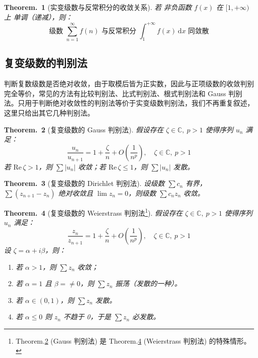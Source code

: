 \documentclass[UTF8]{report}
\def\Re{\mathrm{Re\,}}
\def\C{\mathbb{C}}
\theoremstyle{MyLineTheoremStyle} %
\newtheorem{LineTheorem}{Theorem.\,}
\theoremstyle{MyBlockTheoremStyle} %
\newtheorem{BlockTheorem}[LineTheorem]{Theorem.\,} %
\theoremstyle{MySubsubsectionStyle} %
\begin{document}
\begin{BlockTheorem}[实变级数与反常积分的收敛关系]\label{级数与反常积分的收敛关系}
    若{\color{red} 非负}函数 $f(x)$ 在 $[1, +\infty)$ 上 {\color{red} 单调}（递减），则：
    \begin{equation}
    \text{级数\ } \sum_{n=1}^{\infty}f(n) \text{\ 与反常积分\ } \int_{1}^{+\infty} f(x) \ \mathrm{d}x \text{\ 同敛散}
    \end{equation}
\end{BlockTheorem}
    

\subsection{复变级数的判别法}

判断复数级数是否绝对收敛，由于取模后皆为正实数，因此与正项级数的收敛判别完全等价，常见的方法有比较判别法、比式判别法、根式判别法和 Gauss 判别法。只用于判断绝对收敛性的判别法等价于实变级数判别法，我们不再重复叙述，这里只给出其它几种判别法。

\begin{LineTheorem}[复变级数的 Gauss 判别法]\label{Gauss 判别法}
假设存在 $\zeta \in \C, \ p > 1$ 使得序列 $u_n$ 满足：
\begin{equation}
    \frac{u_n}{u_{n+1}} = 1 + \frac{\zeta}{n} + O\left( \frac{1}{n^p} \right),\quad \zeta \in \C, \ p > 1
\end{equation}
若 $\Re \zeta > 1$，则 $\sum | u_n |$ 收敛；若 $\Re \zeta \leqslant 1$，则 $\sum | u_n |$ 发散。
\end{LineTheorem}

\begin{LineTheorem}[复变级数的 Dirichlet 判别法]\label{Dirichlet 判别法}
    设级数 $\sum c_n$ 有界，$\sum \left(z_{n+1} - z_{n}\right)$ 绝对收敛且 $\lim z_n = 0$，则级数 $\sum c_n z_n$ 收敛。
\end{LineTheorem}

\begin{BlockTheorem}[复变级数的 Weierstrass 判别法\footnote{Theorem.\ref{Gauss 判别法} (Gauss 判别法) 是 Theorem.\ref{Weierstrass 判别法} (Weierstrass 判别法) 的特殊情形。}]\label{Weierstrass 判别法}
    假设存在 $\zeta \in \C, \ p > 1$ 使得序列 $u_n$ 满足：
    \begin{equation}
        \frac{z_n}{z_{n+1}} = 1 + \frac{\zeta}{n} + O\left( \frac{1}{n^p} \right),\quad \zeta \in \C, \ p > 1
    \end{equation}
    设 $\zeta = \alpha + i\beta$，则：
    \begin{enumerate}
    \item 若 $\alpha > 1$，则 $\sum z_n$ 收敛；
    \item 若 $\alpha = 1$ 且 $\beta = \ne 0$，则 $\sum z_n$ 振荡（发散的一种）。
    \item 若 $\alpha \in (0,1)$，则 $\sum z_n$ 发散。
    \item 若 $\alpha \leqslant 0$ 则 $z_n$ 不趋于 0，于是 $\sum z_n$ 必发散。
    \end{enumerate}
\end{BlockTheorem}
\end{document}
